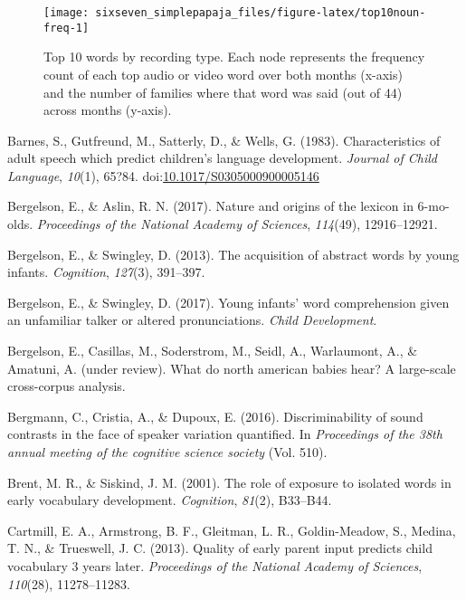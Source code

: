 \documentclass[man]{apa6}
\theoremstyle{definition}
\theoremstyle{definition}
\theoremstyle{definition}
\theoremstyle{remark}
\begin{document}
\begin{figure}
\texttt{[image: sixseven\_simplepapaja\_files/figure-latex/top10noun-freq-1]} \caption{Top 10 words by recording type. Each node represents the frequency count of each top audio or video word over both months (x-axis) and the number of families where that word was said (out of 44) across months (y-axis).}\label{fig:top10noun-freq}
\end{figure}

\setlength{\parindent}{-0.5in} \setlength{\leftskip}{0.5in}

\hypertarget{refs}{}
\hypertarget{ref-barnes1983characteristics}{}
Barnes, S., Gutfreund, M., Satterly, D., \& Wells, G. (1983).
Characteristics of adult speech which predict children's language
development. \emph{Journal of Child Language}, \emph{10}(1), 65?84.
doi:\href{https://doi.org/10.1017/S0305000900005146}{10.1017/S0305000900005146}

\hypertarget{ref-bergelson2017nature}{}
Bergelson, E., \& Aslin, R. N. (2017). Nature and origins of the lexicon
in 6-mo-olds. \emph{Proceedings of the National Academy of Sciences},
\emph{114}(49), 12916--12921.

\hypertarget{ref-bergelson2013acquisition}{}
Bergelson, E., \& Swingley, D. (2013). The acquisition of abstract words
by young infants. \emph{Cognition}, \emph{127}(3), 391--397.

\hypertarget{ref-bergelson2017young}{}
Bergelson, E., \& Swingley, D. (2017). Young infants' word comprehension
given an unfamiliar talker or altered pronunciations. \emph{Child
Development}.

\hypertarget{ref-bergelsonunderreview}{}
Bergelson, E., Casillas, M., Soderstrom, M., Seidl, A., Warlaumont, A.,
\& Amatuni, A. (under review). What do north american babies hear? A
large-scale cross-corpus analysis.

\hypertarget{ref-bergmann2016discriminability}{}
Bergmann, C., Cristia, A., \& Dupoux, E. (2016). Discriminability of
sound contrasts in the face of speaker variation quantified. In
\emph{Proceedings of the 38th annual meeting of the cognitive science
society} (Vol. 510).

\hypertarget{ref-brent2001role}{}
Brent, M. R., \& Siskind, J. M. (2001). The role of exposure to isolated
words in early vocabulary development. \emph{Cognition}, \emph{81}(2),
B33--B44.

\hypertarget{ref-cartmill2013quality}{}
Cartmill, E. A., Armstrong, B. F., Gleitman, L. R., Goldin-Meadow, S.,
Medina, T. N., \& Trueswell, J. C. (2013). Quality of early parent input
predicts child vocabulary 3 years later. \emph{Proceedings of the
National Academy of Sciences}, \emph{110}(28), 11278--11283.
\end{document}
